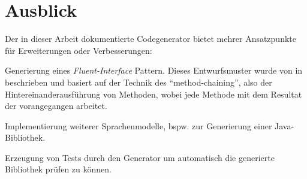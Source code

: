 \section{Ausblick}
\label{sec:prospect}


Der in dieser Arbeit dokumentierte Codegenerator bietet mehrer Ansatzpunkte für Erweiterungen oder Verbesserungen:

\begin{compactitem}
    \item Generierung eines \emph{Fluent-Interface} Pattern. Dieses Entwurfsmuster wurde von \citeauthor{fowler2010domain} in \cite{fowler2010domain} beschrieben und basiert auf der Technik des \enquote{method-chaining}, also der Hintereinanderausführung von Methoden, wobei jede Methode mit dem Resultat der vorangegangen arbeitet.
    \item Implementierung weiterer Sprachenmodelle, bspw. zur Generierung einer Java-Bibliothek. 
    \item Erzeugung von Tests durch den Generator um automatisch die generierte Bibliothek prüfen zu können.
\end{compactitem}